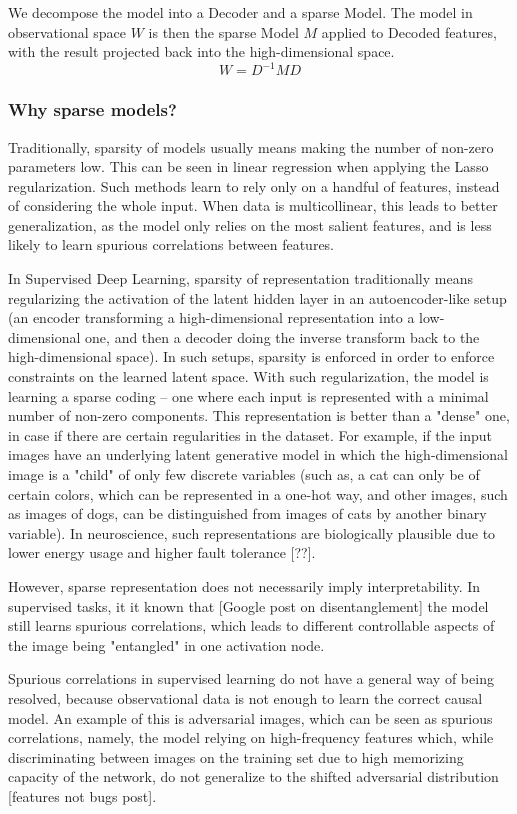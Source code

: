 \documentclass[a4paper,11pt,oneside]{report}
\begin{document}
We decompose the model into a Decoder and a sparse Model. The model in observational space $W$ is then the sparse Model $M$ applied to Decoded features, with the result projected back into the high-dimensional space.
$$
W=D^{-1}MD
$$

\subsubsection{Why sparse models?}
Traditionally, sparsity of models usually means making the number of non-zero parameters low. This can be seen in linear regression when applying the Lasso regularization. Such methods learn to rely only on a handful of features, instead of considering the whole input. When data is multicollinear, this leads to better generalization, as the model only relies on the most salient features, and is less likely to learn spurious correlations between features.

In Supervised Deep Learning, sparsity of representation traditionally means regularizing the activation of the latent hidden layer in an autoencoder-like setup (an encoder transforming a high-dimensional representation into a low-dimensional one, and then a decoder doing the inverse transform back to the high-dimensional space). In such setups, sparsity is enforced in order to enforce constraints on the learned latent space. With such regularization, the model is learning a sparse coding -- one where each input is represented with a minimal number of non-zero components.
This representation is better than a "dense" one, in case if there are certain regularities in the dataset.
For example, if the input images have an underlying latent generative model in which the high-dimensional image is a "child" of only few discrete variables (such as, a cat can only be of certain colors, which can be represented in a one-hot way, and other images, such as images of dogs, can be distinguished from images of cats by another binary variable).
In neuroscience, such representations are biologically plausible due to lower energy usage and higher fault tolerance [??].

However, sparse representation does not necessarily imply interpretability. In supervised tasks, it it known that [Google post on disentanglement] the model still learns spurious correlations, which leads to different controllable aspects of the image being "entangled" in one activation node.

Spurious correlations in supervised learning do not have a general way of being resolved, because observational data is not enough to learn the correct causal model. An example of this is adversarial images, which can be seen as spurious correlations, namely, the model relying on high-frequency features which, while discriminating between images on the training set due to high memorizing capacity of the network, do not generalize to the shifted adversarial distribution [features not bugs post].
\end{document}
